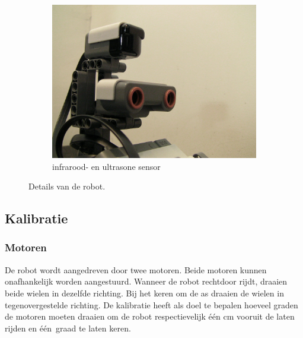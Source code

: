 \documentclass[tt3]{penoverslag}
\begin{document}
\begin{figure}
\begin{subfigure}[h]{0.325\textwidth}
		\includegraphics[width=\textwidth]{robotSensoren}
		\caption{infrarood- en ultrasone sensor}
	\end{subfigure}
\caption{Details van de robot.}
\label{fig:robotDetail}
\end{figure}

\subsection{Kalibratie}
\label{ssec:Kalib}

\subsubsection{Motoren}
De robot wordt aangedreven door twee motoren. Beide motoren kunnen onafhankelijk worden aangestuurd. Wanneer de robot rechtdoor rijdt, draaien beide wielen in dezelfde richting. Bij het keren om de as draaien de wielen in tegenovergestelde richting. De kalibratie heeft als doel te bepalen hoeveel graden de motoren moeten draaien om de robot respectievelijk \'e\'en cm vooruit de laten rijden en \'e\'en~graad te laten keren.
\end{document}
